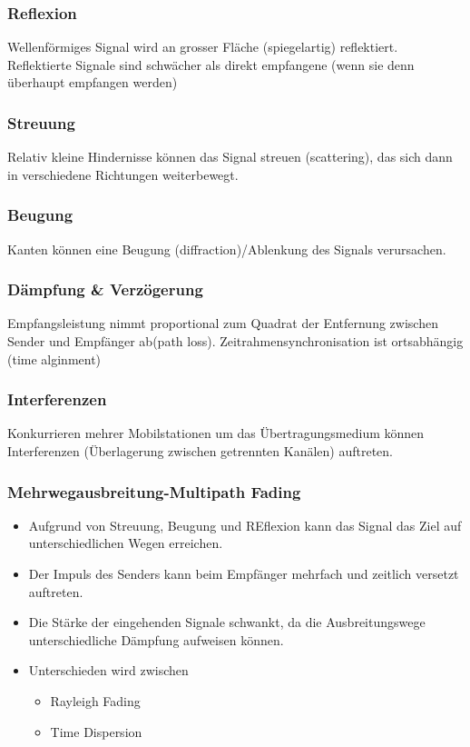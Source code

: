 \subsubsection{Reflexion}
Wellenförmiges Signal wird an grosser Fläche (spiegelartig) reflektiert. Reflektierte Signale sind schwächer als direkt empfangene (wenn sie denn überhaupt empfangen werden)

\subsubsection{Streuung}
Relativ kleine Hindernisse können das Signal streuen (scattering), das sich dann in verschiedene Richtungen weiterbewegt.

\subsubsection{Beugung}
Kanten können eine Beugung (diffraction)/Ablenkung des Signals verursachen.

\subsubsection{Dämpfung \& Verzögerung}
Empfangsleistung nimmt proportional zum Quadrat der Entfernung zwischen Sender und Empfänger ab(path loss). Zeitrahmensynchronisation ist ortsabhängig (time alginment)

\subsubsection{Interferenzen}
Konkurrieren mehrer Mobilstationen um das Übertragungsmedium können Interferenzen (Überlagerung zwischen getrennten Kanälen) auftreten.

\subsubsection{Mehrwegausbreitung-Multipath Fading}
\begin{itemize}
\item Aufgrund von Streuung, Beugung und REflexion kann das Signal das Ziel auf unterschiedlichen Wegen erreichen.
\item Der Impuls des Senders kann beim Empfänger mehrfach und zeitlich versetzt auftreten.
\item Die Stärke der eingehenden Signale schwankt, da die Ausbreitungswege unterschiedliche Dämpfung aufweisen können.
\item Unterschieden wird zwischen 
\begin{itemize}
\item Rayleigh Fading 
\item Time Dispersion
\end{itemize}
\end{itemize}

